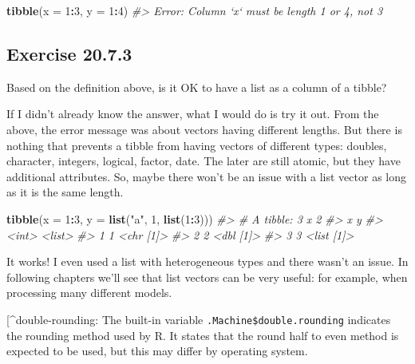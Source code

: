 \documentclass[]{book}
\newenvironment{Shaded}{\begin{snugshade}}{\end{snugshade}}
\newcommand{\CommentTok}[1]{\textcolor[rgb]{0.56,0.35,0.01}{\textit{#1}}}
\newcommand{\DataTypeTok}[1]{\textcolor[rgb]{0.13,0.29,0.53}{#1}}
\newcommand{\DecValTok}[1]{\textcolor[rgb]{0.00,0.00,0.81}{#1}}
\newcommand{\KeywordTok}[1]{\textcolor[rgb]{0.13,0.29,0.53}{\textbf{#1}}}
\newcommand{\NormalTok}[1]{#1}
\newcommand{\OperatorTok}[1]{\textcolor[rgb]{0.81,0.36,0.00}{\textbf{#1}}}
\newcommand{\StringTok}[1]{\textcolor[rgb]{0.31,0.60,0.02}{#1}}
\theoremstyle{plain}
\theoremstyle{remark}
\begin{document}
\begin{Shaded}
\begin{Highlighting}[]
\KeywordTok{tibble}\NormalTok{(}\DataTypeTok{x =} \DecValTok{1}\OperatorTok{:}\DecValTok{3}\NormalTok{, }\DataTypeTok{y =} \DecValTok{1}\OperatorTok{:}\DecValTok{4}\NormalTok{)}
\CommentTok{#> Error: Column `x` must be length 1 or 4, not 3}
\end{Highlighting}
\end{Shaded}

\hypertarget{exercise-20.7.3}{%
\subsection*{\texorpdfstring{Exercise
{20.7.3}}{Exercise 20.7.3}}\label{exercise-20.7.3}}

Based on the definition above, is it OK to have a list as a column of a
tibble?

If I didn't already know the answer, what I would do is try it out. From
the above, the error message was about vectors having different lengths.
But there is nothing that prevents a tibble from having vectors of
different types: doubles, character, integers, logical, factor, date.
The later are still atomic, but they have additional attributes. So,
maybe there won't be an issue with a list vector as long as it is the
same length.

\begin{Shaded}
\begin{Highlighting}[]
\KeywordTok{tibble}\NormalTok{(}\DataTypeTok{x =} \DecValTok{1}\OperatorTok{:}\DecValTok{3}\NormalTok{, }\DataTypeTok{y =} \KeywordTok{list}\NormalTok{(}\StringTok{"a"}\NormalTok{, }\DecValTok{1}\NormalTok{, }\KeywordTok{list}\NormalTok{(}\DecValTok{1}\OperatorTok{:}\DecValTok{3}\NormalTok{)))}
\CommentTok{#> # A tibble: 3 x 2}
\CommentTok{#>       x y         }
\CommentTok{#>   <int> <list>    }
\CommentTok{#> 1     1 <chr [1]> }
\CommentTok{#> 2     2 <dbl [1]> }
\CommentTok{#> 3     3 <list [1]>}
\end{Highlighting}
\end{Shaded}

It works! I even used a list with heterogeneous types and there wasn't
an issue. In following chapters we'll see that list vectors can be very
useful: for example, when processing many different models.

{[}\^{}double-rounding: The built-in variable
\texttt{.Machine\$double.rounding} indicates the rounding method used by
R. It states that the round half to even method is expected to be used,
but this may differ by operating system.
\end{document}
